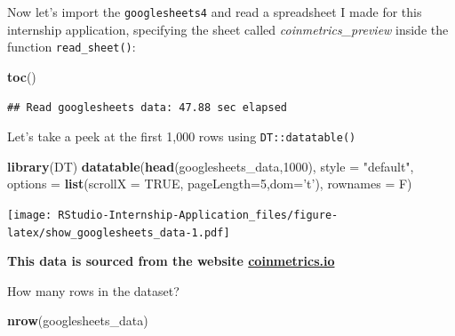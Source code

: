 \documentclass[
]{book}
\newenvironment{Shaded}{\begin{snugshade}}{\end{snugshade}}
\newcommand{\CommentTok}[1]{\textcolor[rgb]{0.56,0.35,0.01}{\textit{#1}}}
\newcommand{\DataTypeTok}[1]{\textcolor[rgb]{0.13,0.29,0.53}{#1}}
\newcommand{\DecValTok}[1]{\textcolor[rgb]{0.00,0.00,0.81}{#1}}
\newcommand{\KeywordTok}[1]{\textcolor[rgb]{0.13,0.29,0.53}{\textbf{#1}}}
\newcommand{\NormalTok}[1]{#1}
\newcommand{\OperatorTok}[1]{\textcolor[rgb]{0.81,0.36,0.00}{\textbf{#1}}}
\newcommand{\OtherTok}[1]{\textcolor[rgb]{0.56,0.35,0.01}{#1}}
\newcommand{\StringTok}[1]{\textcolor[rgb]{0.31,0.60,0.02}{#1}}
\begin{document}
Now let's import the \texttt{googlesheets4} and read a spreadsheet I made for this internship application, specifying the sheet called \emph{coinmetrics\_preview} inside the function \texttt{read\_sheet()}:

\begin{Shaded}
\end{Shaded}

\begin{Shaded}
\begin{Highlighting}[]
\KeywordTok{toc}\NormalTok{()}
\end{Highlighting}
\end{Shaded}

\begin{verbatim}
## Read googlesheets data: 47.88 sec elapsed
\end{verbatim}

Let's take a peek at the first 1,000 rows using \texttt{DT::datatable()} \citep{R-DT}

\begin{Shaded}
\begin{Highlighting}[]
\KeywordTok{library}\NormalTok{(DT)}
\KeywordTok{datatable}\NormalTok{(}\KeywordTok{head}\NormalTok{(googlesheets_data,}\DecValTok{1000}\NormalTok{),  }\DataTypeTok{style =} \StringTok{"default"}\NormalTok{, }
          \DataTypeTok{options =} \KeywordTok{list}\NormalTok{(}\DataTypeTok{scrollX =} \OtherTok{TRUE}\NormalTok{, }\DataTypeTok{pageLength=}\DecValTok{5}\NormalTok{,}\DataTypeTok{dom=}\StringTok{'t'}\NormalTok{), }\DataTypeTok{rownames =}\NormalTok{ F)}
\end{Highlighting}
\end{Shaded}

\texttt{[image: RStudio-Internship-Application\_files/figure-latex/show\_googlesheets\_data-1.pdf]}

\textbf{This data is sourced from the website \href{https://coinmetrics.io/community-network-data/\#comm-files}{coinmetrics.io}}

How many rows in the dataset?

\begin{Shaded}
\begin{Highlighting}[]
\KeywordTok{nrow}\NormalTok{(googlesheets_data)}
\end{Highlighting}
\end{Shaded}
\end{document}
